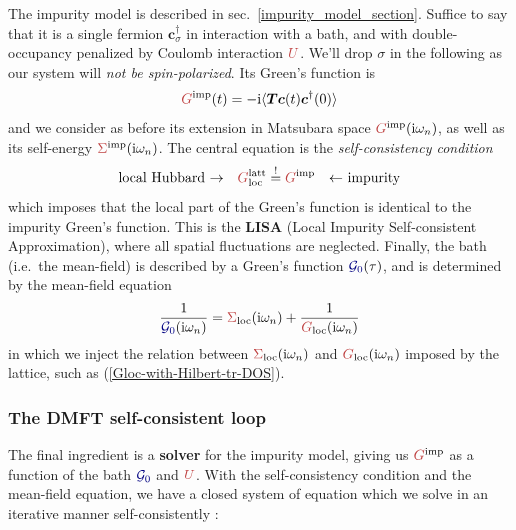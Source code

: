 \documentclass[reprint,amsmath,amssymb,aps,pra]{revtex4-2}
\newcommand{\mathi}{\mathrm{i}}
\newcommand{\tmbf}[1]{\ensuremath{\boldsymbol{#1}}}
\newcommand{\iwn}{\mathrm{i}\omega_n}
\begin{document}
The impurity model is described in sec.~\ref{impurity_model_section}. Suffice to say that it is a single fermion $\tmbf{c}_{\sigma}^{\dag}$ in interaction with a {\color[HTML]{000080}bath}, and with double-occupancy penalized by Coulomb interaction ${\color[HTML]{BF4040}U}$. We'll drop ${\sigma}$ in the following as our system will \emph{not be spin-polarized}. Its Green's function is
\begin{equation}
  {\color[HTML]{BF4040}G}^{\text{imp}}(t) = -\mathi \langle \tmbf{T} \tmbf{c}(t)  \tmbf{c}^{\dag}(0) \rangle
  \label{Gimp-def}
\end{equation}
and we consider as before its extension in Matsubara space ${\color[HTML]{BF4040}G}^{\text{imp}}(\iwn)$, as well as its self-energy ${\color[HTML]{BF4040}\Sigma}^{\text{imp}}(\iwn)$. The central equation is the \emph{self-consistency condition}
\begin{equation}
    \text{local Hubbard $\rightarrow$\quad}
    {\color[HTML]{BF4040}G}_{\text{loc}}^{\text{latt}} \overset{!}{=}
    {\color[HTML]{BF4040}G}^{\text{imp}}
    \quad \text{$\leftarrow$ impurity}
  \label{LISA-self-consistency}
\end{equation}
which imposes that the local part of the Green's function is identical to the impurity Green's function. This is the \textbf{LISA} (Local Impurity Self-consistent Approximation), where all spatial fluctuations are neglected. Finally, the bath (i.e.\ the mean-field) is described by a Green's function ${\color[HTML]{000080}\mathcal{G}_0}(\tau)$, and is determined by the mean-field equation
\begin{equation}
    \frac{1}{{\color[HTML]{000080}\mathcal{G}_0}(\iwn)} = {\color[HTML]{BF4040}\Sigma}_\text{loc}(\iwn) + \frac{1}{{\color[HTML]{BF4040}G}_\text{loc}(\iwn)}
    \label{mean_field_equation}
\end{equation}
in which we inject the relation between ${\color[HTML]{BF4040}\Sigma}_\text{loc}(\iwn)$ and ${\color[HTML]{BF4040}G}_\text{loc}(\iwn)$ imposed by the lattice, such as (\ref{Gloc-with-Hilbert-tr-DOS}).

\subsubsection{The DMFT self-consistent loop}

The final ingredient is a \textbf{solver} for the impurity model, giving us ${\color[HTML]{BF4040}G}^{\text{imp}}$ as a function of
the bath ${\color[HTML]{000080}\mathcal{G}_0}$ and ${\color[HTML]{BF4040}U}$. With the self-consistency condition and the mean-field equation, we have a closed system of equation which we solve in an iterative manner self-consistently :
\end{document}
